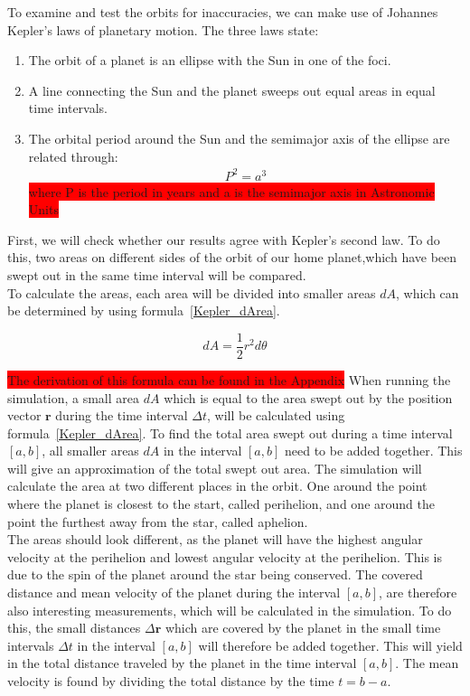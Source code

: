 \documentclass[reprint,english,notitlepage]{revtex4-2}
\begin{document}
To examine and test the orbits for inaccuracies, we can make use of Johannes Kepler's laws of planetary motion.
The three laws state:
\begin{enumerate}
    \item The orbit of a planet is an ellipse with the
		Sun in one of the foci.
	\item A line connecting the Sun and the planet
		sweeps out equal areas in equal time intervals.
	\item The orbital period around the Sun and the
		semimajor axis of the ellipse are related through:
		\begin{align*}
		    P^2 = a^3
		\end{align*}
		\colorbox{red}{where P is the period in years and a is the
		semimajor axis in Astronomic Units}
\end{enumerate}

First, we will check whether our results agree with Kepler's second law.
To do this, two areas on different sides of the orbit of our home planet,which have been swept out in the same time interval will be compared.\\
To calculate the areas, each area will be divided into smaller areas $dA$, which can be determined by using formula~\eqref{Kepler_dArea}.

\begin{equation} \label{Kepler_dArea}
    dA = \frac{1}{2}r^2 d\theta 
\end{equation}

\colorbox{red}{The derivation of this formula can be found in the Appendix}
When running the simulation, a small area $dA$ which is equal to the area swept out by the position vector $\textbf{r}$ during the time interval $\Delta t$, will be calculated using formula~\eqref{Kepler_dArea}.
To find the total area swept out during a time interval $[a, b]$, all smaller areas $dA$ in the interval $[a, b]$ need to be added together.
This will give an approximation of the total swept out area.
The simulation will calculate the area at two different places in the orbit.
One around the point where the planet is closest to the start, called perihelion, and one around the point the furthest away from the star, called aphelion.\\
The areas should look different, as the planet will have the highest angular velocity at the perihelion and lowest angular velocity at the perihelion.
This is due to the spin of the planet around the star being conserved.
The covered distance and mean velocity of the planet during the interval $[a, b]$, are therefore also interesting measurements, which will be calculated in the simulation.
To do this, the small distances $\Delta \textbf{r}$ which are covered by the planet in the small time intervals $\Delta t$ in the interval $[a, b]$ will therefore be added together.
This will yield in the total distance traveled by the planet in the time interval $[a, b]$.
The mean velocity is found by dividing the total distance by the time $t = b-a$.\newline
\end{document}
